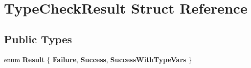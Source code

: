 \hypertarget{structTypeCheckResult}{}\section{Type\+Check\+Result Struct Reference}
\label{structTypeCheckResult}
\subsection*{Public Types}
\begin{DoxyCompactItemize}
\item 
\mbox{\label{structTypeCheckResult_a6e4b97b4233f002c05e2a773bcefee8b}} 
enum {\bfseries Result} \{ {\bfseries Failure}, 
{\bfseries Success}, 
{\bfseries Success\+With\+Type\+Vars}
 \}
\end{DoxyCompactItemize}
